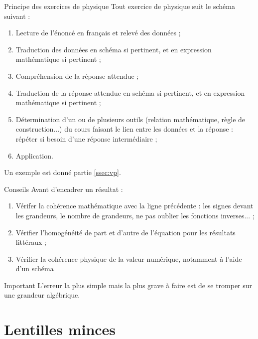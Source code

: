 \documentclass[10pt,a5paper,notitlepage]{book}
\begin{document}
\begin{rtcb}{Principe des exercices de physique}
    Tout exercice de physique suit le schéma suivant :
    \begin{enumerate}
        \item Lecture de l'énoncé en français et relevé des données ;
        \item Traduction des données en schéma si pertinent, et en expression
            mathématique si pertinent ;
        \item Compréhension de la réponse attendue ;
        \item Traduction de la réponse attendue en schéma si pertinent, et en
            expression mathématique si pertinent ;
        \item Détermination d'un ou de plusieurs outils (relation mathématique,
            règle de construction...) du cours faisant le lien entre les données
            et la réponse : répéter si besoin d'une réponse intermédiaire ;
        \item Application.
    \end{enumerate}
    Un exemple est donné partie \ref{ssec:vp}.
\end{rtcb}


\begin{ptcb}{Conseils}
    Avant d'encadrer un résultat :
    \begin{enumerate}
        \item Vérifer la cohérence mathématique avec la ligne précédente : les
            signes devant les grandeurs, le nombre de grandeurs, ne pas oublier
            les fonctions inverses... ;
        \item Vérifier l'homogénéité de part et d'autre de l'équation pour les
            résultats littéraux ;
        \item Vérifier la cohérence physique de la valeur numérique, notamment à
            l'aide d'un schéma
    \end{enumerate}
\end{ptcb}

\begin{bvtcb}{Important}
    L'erreur la plus simple mais la plus grave à faire est de se tromper sur une
    grandeur algébrique.
    \begin{center}
    \end{center}
\end{bvtcb}

\chapter{Lentilles minces}\label{ch:O1}
\vspace*{-24pt}
\end{document}
